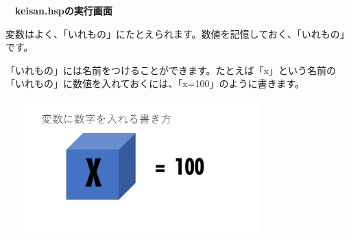 \documentclass[a4paper,dvipdfmx]{jarticle}
\newcommand\textstyleqwerty[1]{#1}
\begin{document}
\bigskip


\bigskip


\bigskip


\bigskip


\bigskip


\bigskip


\bigskip


\bigskip


\bigskip


\bigskip


\bigskip

\textstyleqwerty{\textbf{　keisan.hspの実行画面}}


\bigskip


\bigskip


\bigskip

変数はよく、「いれもの」にたとえられます。数値を記憶しておく、「いれもの」です。

「いれもの」には名前をつけることができます。たとえば「x」という名前の「いれもの」に数値を入れておくには、「x=100」のように書きます。


\bigskip



\begin{center}
\includegraphics[width=10.478cm,height=5.106cm]{text02-img/text02-img045.png}

\end{center}

\bigskip


\bigskip


\bigskip


\bigskip


\bigskip


\bigskip


\bigskip


\bigskip


\bigskip


\bigskip


\bigskip


\bigskip
\end{document}
